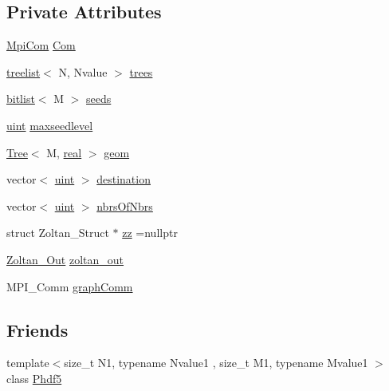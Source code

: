 \subsection*{Private Attributes}
\begin{DoxyCompactItemize}
\item 
\mbox{\hyperlink{structMpiCom}{Mpi\+Com}} \mbox{\hyperlink{classForest_a99577d96bafe893570546d8eb6c00078}{Com}}
\item 
\mbox{\hyperlink{forest_8h_af5ed6d1f9068fb44be5133afda14c2ac}{treelist}}$<$ N, Nvalue $>$ \mbox{\hyperlink{classForest_ae9d42713a72e131d95579babb5a5239c}{trees}}
\item 
\mbox{\hyperlink{definitions_8h_ad1cc49840e065ce2a93cd243916d310c}{bitlist}}$<$ M $>$ \mbox{\hyperlink{classForest_a1585582bca7201113f97a6ff2f5dc859}{seeds}}
\item 
\mbox{\hyperlink{definitions_8h_a69aa29b598b851b0640aa225a9e5d61d}{uint}} \mbox{\hyperlink{classForest_af84a901b60f3d4d9e14c68560f8a2a29}{maxseedlevel}}
\item 
\mbox{\hyperlink{classTree}{Tree}}$<$ M, \mbox{\hyperlink{definitions_8h_aedc0ad84d1e764530814f57ad931d02a}{real}} $>$ \mbox{\hyperlink{classForest_a4002149b64e8a87b94811ea2acbce4f4}{geom}}
\item 
vector$<$ \mbox{\hyperlink{definitions_8h_a69aa29b598b851b0640aa225a9e5d61d}{uint}} $>$ \mbox{\hyperlink{classForest_a1bb5dceeeda8307effdfb5e261fcc634}{destination}}
\item 
vector$<$ \mbox{\hyperlink{definitions_8h_a69aa29b598b851b0640aa225a9e5d61d}{uint}} $>$ \mbox{\hyperlink{classForest_a7e4badd955dbb535328dc18b3c782d3d}{nbrs\+Of\+Nbrs}}
\item 
struct Zoltan\+\_\+\+Struct $\ast$ \mbox{\hyperlink{classForest_a44a511be69173780d2804d373df3a3f1}{zz}} =nullptr
\item 
\mbox{\hyperlink{structZoltan__Out}{Zoltan\+\_\+\+Out}} \mbox{\hyperlink{classForest_ade305be3714d6cb24b7e8f8950f7cd94}{zoltan\+\_\+out}}
\item 
M\+P\+I\+\_\+\+Comm \mbox{\hyperlink{classForest_ad6b1077285024b63e72da29b844b9cce}{graph\+Comm}}
\end{DoxyCompactItemize}
\subsection*{Friends}
\begin{DoxyCompactItemize}
\item 
{\footnotesize template$<$size\+\_\+t N1, typename Nvalue1 , size\+\_\+t M1, typename Mvalue1 $>$ }\\class \mbox{\hyperlink{classForest_a767bab0f40c9f0d8d155b7dc5dda1a8b}{Phdf5}}
\end{DoxyCompactItemize}


